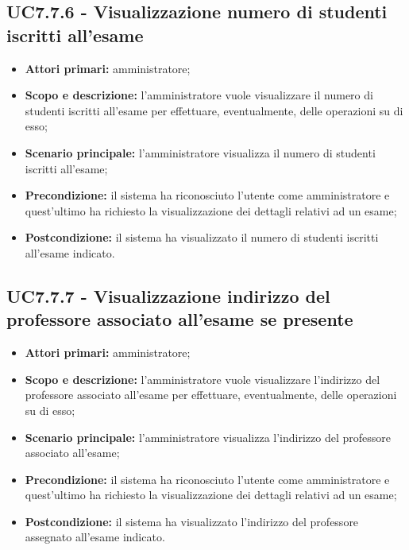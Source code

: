 \documentclass[AnalisiDeiRequisiti.tex]{subfiles}
\begin{document}
\subsection{UC7.7.6 - Visualizzazione numero di studenti iscritti all'esame}
\begin{itemize}
	\item \textbf{Attori primari:} amministratore;
	\item \textbf{Scopo e descrizione:} l'amministratore vuole visualizzare il numero di studenti iscritti all'esame per effettuare, eventualmente, delle operazioni su di esso;
	\item \textbf{Scenario principale:} l'amministratore visualizza il numero di studenti iscritti all'esame;
	\item \textbf{Precondizione:} il sistema ha riconosciuto l'utente come amministratore e quest'ultimo ha richiesto la visualizzazione dei dettagli relativi ad un esame; 
	\item \textbf{Postcondizione:} il sistema ha visualizzato il numero di studenti iscritti all'esame indicato.
\end{itemize}
\subsection{UC7.7.7 - Visualizzazione indirizzo del professore associato all'esame se presente}
\begin{itemize}
	\item \textbf{Attori primari:} amministratore;
	\item \textbf{Scopo e descrizione:} l'amministratore vuole visualizzare l'indirizzo del professore associato all'esame per effettuare, eventualmente, delle operazioni su di esso;
	\item \textbf{Scenario principale:} l'amministratore visualizza l'indirizzo del professore associato all'esame;
	\item \textbf{Precondizione:} il sistema ha riconosciuto l'utente come amministratore e quest'ultimo ha richiesto la visualizzazione dei dettagli relativi ad un esame; 
	\item \textbf{Postcondizione:} il sistema ha visualizzato l'indirizzo del professore assegnato all'esame indicato.
\end{itemize}
\end{document}

